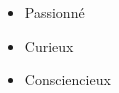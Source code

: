 %
%
%

\twocolumnsection
{
\begin{skills}
\end{skills}}
{
\vspace{1em}
\begin{itemize}
	\item Passionné
	\item Curieux
    \item Consciencieux
\end{itemize}
}
